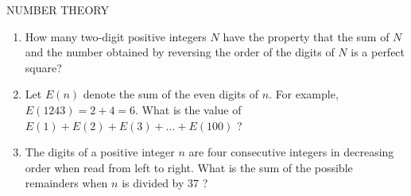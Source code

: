 \documentclass{article}
\begin{document}
\begin{center}
NUMBER THEORY
\end{center}
\begin{enumerate}
\item How many two-digit positive integers $N$ have the property that the sum of $N$ and the number obtained by reversing the order of the digits of $N$ is a perfect square?
\item Let $E\left(n\right)$ denote the sum of the even digits of $n$. For example, $E\left(1243\right) = 2 + 4 = 6$. What is the value of $E\left(1\right) + E\left(2\right) + E\left(3\right)+ \dots + E\left(100\right)$ ?
\item The digits of a positive integer $n$ are four consecutive integers in decreasing order when read from left to right. What is the sum of the possible remainders when $n$ is divided by $37$ ? 
\end{enumerate}
\end{document}
